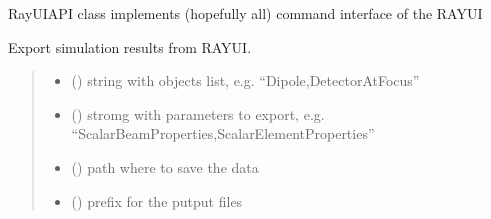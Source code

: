 \documentclass[letterpaper,10pt,english]{sphinxmanual}
\begin{document}
\begin{fulllineitems}
\label{\detokenize{API:raypyng.runner.RayUIAPI}}
\pysigstartsignatures
{}
\pysigstopsignatures
\sphinxAtStartPar
RayUIAPI class implements (hopefully all) command interface of the RAY\sphinxhyphen{}UI

\begin{fulllineitems}
\label{\detokenize{API:raypyng.runner.RayUIAPI.export}}
\pysigstartsignatures
{}
\pysigstopsignatures
\sphinxAtStartPar
Export simulation results from RAY\sphinxhyphen{}UI.
\begin{quote}\begin{description}
\begin{itemize}
\item {} 
\sphinxAtStartPar
{} () \textendash{} string with objects list, e.g. “Dipole,DetectorAtFocus”

\item {} 
\sphinxAtStartPar
{} () \textendash{} stromg with parameters to export, e.g. “ScalarBeamProperties,ScalarElementProperties”

\item {} 
\sphinxAtStartPar
{} () \textendash{} path where to save the data

\item {} 
\sphinxAtStartPar
{} () \textendash{} prefix for the putput files


\end{itemize}
\end{description}
\end{quote}
\end{fulllineitems}
\end{fulllineitems}
\end{document}
